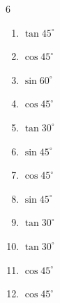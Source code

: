 \begin{multicols}{6}
\begin{enumerate}
  \item $\displaystyle \tan{45^\circ}$

        \phantom{$\displaystyle =1$}

  \item $\displaystyle \cos{45^\circ}$


  \item $\displaystyle \sin{60^\circ}$


  \item $\displaystyle \cos{45^\circ}$


  \item $\displaystyle \tan{30^\circ}$


  \item $\displaystyle \sin{45^\circ}$


  \item $\displaystyle \cos{45^\circ}$


  \item $\displaystyle \sin{45^\circ}$


  \item $\displaystyle \tan{30^\circ}$


\columnbreak %

  \item $\displaystyle \tan{30^\circ}$


  \item $\displaystyle \cos{45^\circ}$


  \item $\displaystyle \cos{45^\circ}$



\end{enumerate}
\end{multicols}

